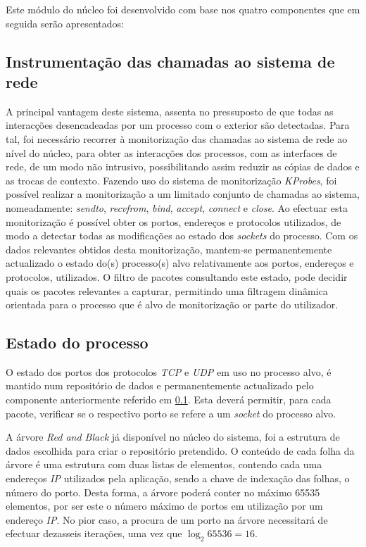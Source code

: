 Este módulo do núcleo foi desenvolvido com base nos quatro componentes que em seguida serão apresentados:


\subsection{Instrumentação das chamadas ao sistema de rede}
\label{sub:mon_syscalls}

A principal vantagem deste sistema, assenta no pressuposto de que todas as interacções desencadeadas por um processo com o exterior são detectadas.
Para tal, foi necessário recorrer à monitorização das chamadas ao sistema de rede ao nível do núcleo, para obter as interacções dos processos, com as interfaces de rede, de um modo não intrusivo, possibilitando assim reduzir as cópias de dados e as trocas de contexto.
Fazendo uso do sistema de monitorização \textit{KProbes}, foi possível realizar a monitorização a um limitado conjunto de chamadas ao sistema, nomeadamente: \textit{sendto}, \textit{recvfrom}, \textit{bind}, \textit{accept}, \textit{connect} e \textit{close}.
Ao efectuar esta monitorização é possível obter os portos, endereços e protocolos utilizados, de modo a detectar todas as modificações ao estado dos \textit{sockets} do processo.
Com os dados relevantes obtidos desta monitorização, mantem-se permanentemente actualizado o estado do(s) processo(s) alvo relativamente aos portos, endereços e protocolos, utilizados.
O filtro de pacotes consultando este estado, pode decidir quais os pacotes relevantes a capturar, permitindo uma filtragem dinâmica orientada para o processo que é alvo de monitorização or parte do utilizador.


\subsection{Estado do processo}
\label{sub:data_repository}

O estado dos portos dos protocolos \textit{TCP} e \textit{UDP} em uso no processo alvo, é mantido num repositório de dados e permanentemente actualizado pelo componente anteriormente referido em \ref{sub:mon_syscalls}.
Esta deverá permitir, para cada pacote, verificar se o respectivo porto se refere a um \textit{socket} do processo alvo.

A árvore \textit{Red and Black} já disponível no núcleo do sistema, foi a estrutura de dados escolhida para criar o repositório pretendido.
O conteúdo de cada folha da árvore é uma estrutura com duas listas de elementos, contendo cada uma endereços \textit{IP} utilizados pela aplicação, sendo a chave de indexação das folhas, o número do porto.
Desta forma, a árvore poderá conter no máximo 65535 elementos, por ser este o número máximo de portos em utilização por um endereço \textit{IP}.
No pior caso, a procura de um porto na árvore necessitará de efectuar dezasseis iterações, uma vez que \begin{math}\log _2 65536 = 16 \end{math}.

